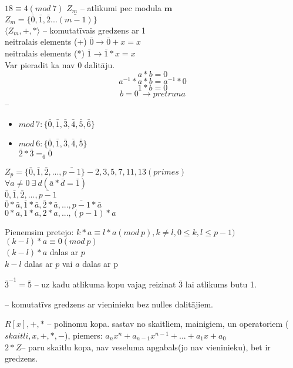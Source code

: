   $18 \equiv 4 (mod \ 7)$
\newline
  $Z_m$ -- atlikumi pec modula $\boldsymbol{m}$ \\
  $Z_m = \{ \bar{0}, \bar{1}, \bar{2} ...\bar{(m-1)}\}$ \\


  $\langle Z_m, +, * \rangle$ -- komutatīvais gredzens ar 1\\
  neitralais elements (+)  $\bar{0} \rightarrow\bar{0} + x = x$ \\
  neitralais elements (*)  $\bar{1} \rightarrow\bar{1} * x = x$ \\

Var pieradit ka nav 0 dalitāju.
$$a * b = 0$$
$$a^{-1}* a * b = a^{-1}*0$$
$$ 1*b = 0$$
$$ b = 0  \  \rightarrow pretruna$$ -- 


\begin{itemize}
  \item $mod \ 7: \{ \bar{0}, \bar{1}, \bar{3}, \bar{4}, \bar{5}, \bar{6}\}$
  \item $mod \ 6: \{ \bar{0}, \bar{1}, \bar{3}, \bar{4}, \bar{5} \}$ \\
  $\bar{2} * \bar{3} =_6 \bar{0} $ 
\end{itemize}
$Z_p = \{ \bar{0}, \bar{1}, \bar{2}, ..., \bar{p-1} \} - 2, 3, 5, 7, 11, 13 (primes) $ \\
$\forall a \ne 0 \ \exists \ d(\bar{a} * \bar{d} = \bar{1})$ \\
$\bar{0}, \bar{1}, \bar{2}, ..., \bar{p-1}$ \\
$\bar{0} * \bar{a}, \bar{1} * \bar{a}, \bar{2} * \bar{a}, ..., \bar{p-1} * \bar{a}$ \\
$0*a, 1*a, 2*a, ..., (p-1)*a$

Pienemsim pretejo: $k*a \equiv l * a (mod \ p), k \ne l , 0 \le k, l \le p-1 )$ \\
$(k -l)*a \equiv 0 (mod \ p)$ \\
$(k - l) * a$ dalas ar $p$ \\
$k -l $  dalas ar $p$ vai $a$ dalas ar p 

$\bar{3}^{-1} = \bar{5}$ -- uz kadu atlikuma kopu vajag reizinat $\bar{3}$ lai atlikums butu 1.


 -- komutatīvs gredzens ar vieninieku bez nulles dalitājiem.

$R[x], +, *$ -- polinomu kopa. sastav no skaitliem, mainigiem, un operatoriem ($skaitli, x, +, *, -$), piemers: $a_nx^n+a_{n-1}x^{n-1}+...+ a_1x + a_0$\\
$2*Z$-- paru skaitlu kopa, nav veseluma apgabals(jo nav vieninieku), bet ir gredzens. \\


